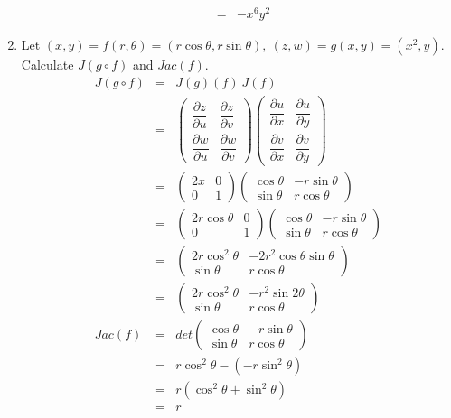 \documentclass[a4paper,10pt]{article}
\begin{document}
\begin{enumerate}
\begin{eqnarray}
	&=& -x^6y^2
	\end{eqnarray}
	\item Let $ (x,y) = f(r,\theta) = (r \cos \theta, r \sin \theta) , \ (z,w) = g(x,y) = (x^2,y) $. Calculate $ J(g \circ f) $ and $ Jac(f) $.
	\begin{eqnarray}\nonumber
	J(g \circ f) &=& J(g)(f) \ J(f) \\ \nonumber
	&=& \left( \begin{array}{cc}
	\dfrac{\partial z}{\partial u} & \dfrac{\partial z}{\partial v} \\
	\dfrac{\partial w}{\partial u} & \dfrac{\partial w}{\partial v}
	\end{array} \right)
	\left( \begin{array}{cc}
	\dfrac{\partial u}{\partial x} & \dfrac{\partial u}{\partial y} \\
	\dfrac{\partial v}{\partial x} & \dfrac{\partial v}{\partial y}
	\end{array} \right) \\ \nonumber
	&=& \left( \begin{array}{cc}
	2x & 0 \\ 0 & 1
	\end{array} \right)
	\left( \begin{array}{cc}
	\cos \theta & -r \sin\theta \\ \sin \theta & r \cos \theta
	\end{array} \right) \\ \nonumber
	&=& \left( \begin{array}{cc}
	2r \cos\theta & 0 \\ 0 & 1
	\end{array} \right)	\left( \begin{array}{cc}
	\cos \theta & -r \sin\theta \\ \sin \theta & r \cos \theta
	\end{array} \right) \\ \nonumber
	&=& \left( \begin{array}{cc}
	2r \cos^2\theta & -2r^2 \cos\theta\sin\theta \\
	\sin\theta & r \cos\theta
	\end{array} \right) \\ \nonumber
	&=& \left( \begin{array}{cc}
	2r \cos^2\theta & -r^2 \sin2\theta \\
	\sin\theta & r \cos\theta
	\end{array} \right) \\ \nonumber
	Jac(f) &=& det \left( \begin{array}{cc}
	\cos \theta & -r \sin\theta \\ \sin \theta & r \cos \theta
	\end{array} \right) \\ \nonumber
	&=& r\cos^2\theta - (-r \sin^2\theta) \\ \nonumber
	&=& r (\cos^2\theta + \sin^2\theta) \\ \nonumber
	&=& r
	\end{eqnarray}
\end{enumerate}
\end{document}

